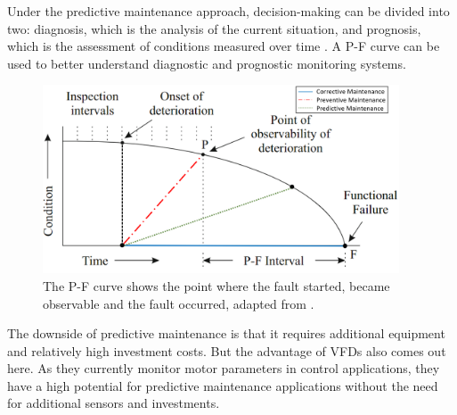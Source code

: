 Under the predictive maintenance approach, decision-making can be divided into two: diagnosis, which is the analysis of the current situation, and prognosis, which is the assessment of conditions measured over time \cite{tinga2019physical}. A P-F curve can be used to better understand diagnostic and prognostic monitoring systems.

\begin{figure}[h]
	\centering
	\includegraphics[width=300pt,keepaspectratio=true]{./fig/PFdiagram.png}
	\caption{The P-F curve shows the point where the fault started, became observable and the fault occurred, adapted from \cite{tinga2019physical}.}	
	\label{PF_diagram}
\end{figure}

The downside of predictive maintenance is that it requires additional equipment and relatively high investment costs. But the advantage of VFDs also comes out here. As they currently monitor motor parameters in control applications, they have a high potential for predictive maintenance applications without the need for additional sensors and investments.



